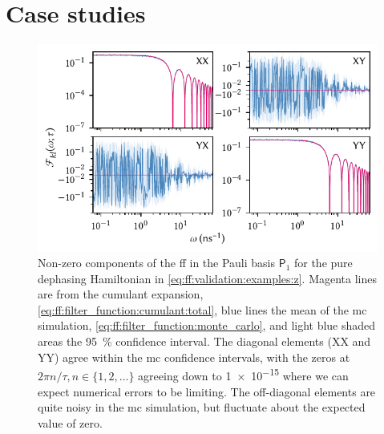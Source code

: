 \section{Case studies}\label{sec:ff:validation:examples}
\begin{figure}
    \centering
    \includegraphics{img/pdf/filter_functions/monte_carlo_FF_Z}
    \caption[]{
        Non-zero components of the \gls{ff} in the Pauli basis $\mathsf{P}_1$ for the pure dephasing Hamiltonian in \cref{eq:ff:validation:examples:z}.
        Magenta lines are from the cumulant expansion, \cref{eq:ff:filter_function:cumulant:total}, blue lines the mean of the \gls{mc} simulation, \cref{eq:ff:filter_function:monte_carlo}, and light blue shaded areas the \qty{95}{\percent} confidence interval.
        The diagonal elements (XX and YY) agree within the \gls{mc} confidence intervals, with the zeros at $2\pi n/\tau, n\in\{1,2,\dotsc\}$ agreeing down to \num{1e-15} where we can expect numerical errors to be limiting.
        The off-diagonal elements are quite noisy in the \gls{mc} simulation, but fluctuate about the expected value of zero.
    }
    \label{fig:ff:monte_carlo:Z}
\end{figure}


